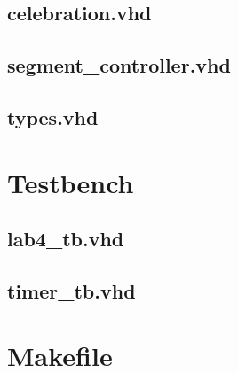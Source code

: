 \documentclass{article}
\begin{document}
\subsection{celebration.vhd}


\subsection{segment\_controller.vhd}


\subsection{types.vhd}


\newpage
\section{Testbench}
\subsection{lab4\_tb.vhd}

\subsection{timer\_tb.vhd}


\newpage
\section{Makefile}

\end{document}
